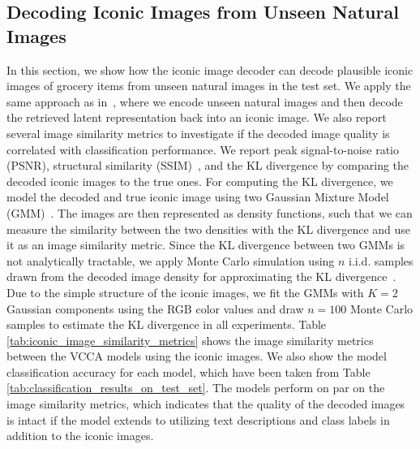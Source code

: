 

\subsection{Decoding Iconic Images from Unseen Natural Images}
\label{sec:decoding_iconic_images} 

In this section, we show how the iconic image decoder can decode plausible iconic images of grocery items from unseen natural images in the test set. We apply the same approach as in~\cite{klasson2019hierarchical}, where we encode unseen natural images and then decode the retrieved latent representation back into an iconic image. We also report several image similarity metrics to investigate if the decoded image quality is correlated with classification performance.
We report peak signal-to-noise ratio (PSNR), structural similarity (SSIM)~\cite{wang2004image}, and the KL divergence by comparing the decoded iconic images to the true ones. For computing the KL divergence, we model the decoded and true iconic image using two Gaussian Mixture Model (GMM)~\cite{cui2015comparison, goldberger2003efficient}. The images are then represented as density functions, such that we can measure the similarity between the two densities with the KL divergence and use it as an image similarity metric. Since the KL divergence between two GMMs is not analytically tractable, we apply Monte Carlo simulation using $n$ i.i.d. samples drawn from the decoded image density for approximating the KL divergence~\cite{hershey2007approximating}. 
Due to the simple structure of the iconic images, we fit the GMMs with $K=2$ Gaussian components using the RGB color values and draw $n=100$ Monte Carlo samples to estimate the KL divergence in all experiments. 
Table \ref{tab:iconic_image_similarity_metrics} shows the image similarity metrics between the VCCA models using the iconic images. We also show the model classification accuracy for each model, which have been taken from Table \ref{tab:classification_results_on_test_set}. 
The models perform on par on the image similarity metrics, which indicates that the quality of the decoded images is intact if the model extends to utilizing text descriptions and class labels in addition to the iconic images.

